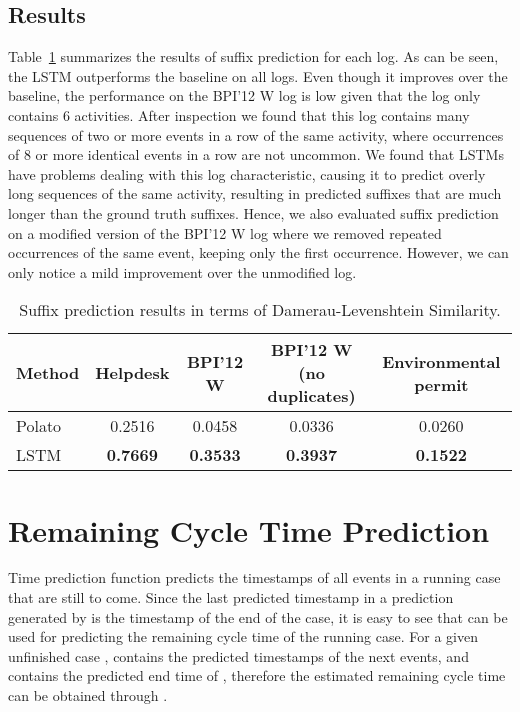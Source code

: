 \documentclass[runningheads,a4paper]{llncs}
\begin{document}
\subsection{Results}
Table~\ref{tab:suffixResults} summarizes the results of suffix prediction for each log. As can be seen, the LSTM outperforms the baseline \cite{Polato2016} on all logs. Even though it improves over the baseline, the performance on the BPI'12 W log is low given that the log only contains 6 activities. After inspection we found that this log contains many sequences of two or more events in a row of the same activity, where occurrences of 8 or more identical events in a row are not uncommon. We found that LSTMs have problems dealing with this log characteristic, causing it to predict overly long sequences of the same activity, resulting in predicted suffixes that are much longer than the ground truth suffixes. Hence, we also evaluated  suffix prediction on a modified version of the BPI'12 W log where we removed repeated occurrences of the same event, keeping only the first occurrence. However, we can only notice a mild improvement over the unmodified log. \begin{table}[hbtp]
	\vspace*{-2mm}
		\centering
	\begin{tabular}{l|c@{\quad}c@{\quad}c@{\quad}c}
		\toprule
		Method & Helpdesk & BPI'12 W & BPI'12 W (no duplicates) & Environmental permit\\
		\midrule
		Polato \cite{Polato2016} &0.2516 & 0.0458 & 0.0336 & 0.0260\\
		LSTM & \textbf{0.7669} & \textbf{0.3533} & \textbf{0.3937} & \textbf{0.1522}\\
		\bottomrule
	\end{tabular}
	\caption{Suffix prediction results in terms of Damerau-Levenshtein Similarity.}
	\label{tab:suffixResults}
	\vspace*{-4mm}
\end{table}

 
\section{Remaining Cycle Time Prediction}
\label{sec:remaining_cycle_time}


\enlargethispage{0.5\baselineskip}
Time prediction function  predicts the timestamps of all events in a running case that are still to come. Since the last predicted timestamp in a prediction generated by  is the timestamp of the end of the case, it is easy to see that  can be used for predicting the remaining cycle time of the running case. For a given unfinished case ,  contains the predicted timestamps of the next events, and  contains the predicted end time of , therefore the estimated remaining cycle time can be obtained through .
\end{document}
